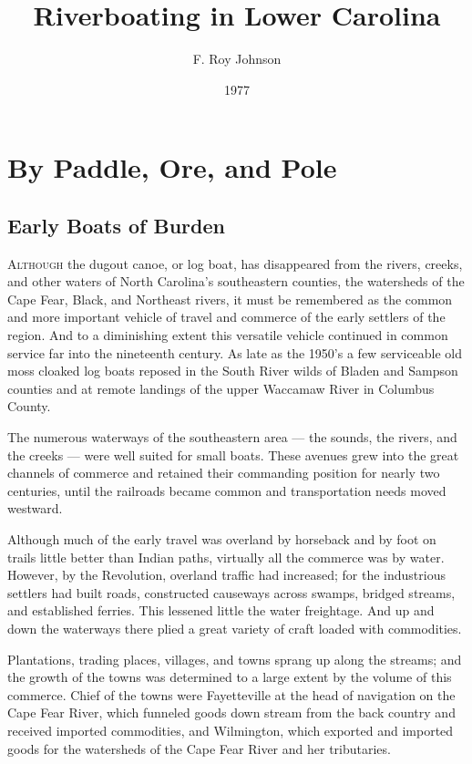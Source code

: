 \documentclass[11pt, a5paper]{book}
\begin{document}
\renewcommand{\thechapter}{\Roman{chapter}}
\title{Riverboating in Lower Carolina}
\author{F. Roy Johnson}
\date{1977}

\maketitle


\chapter{By Paddle, Ore, and Pole}

\section*{Early Boats of Burden}

\textsc{Although} the dugout canoe, or log boat, has disappeared from
the rivers, creeks, and other waters of North Carolina's southeastern
counties, the watersheds of the Cape Fear, Black, and Northeast
rivers, it must be remembered as the common and more important vehicle
of travel and commerce of the early settlers of the region.  And to a
diminishing extent this versatile vehicle continued in common service
far into the nineteenth century.  As late as the 1950's a few
serviceable old moss cloaked log boats reposed in the South River
wilds of Bladen and Sampson counties and at remote landings of the
upper Waccamaw River in Columbus County.\par

The numerous waterways of the southeastern area --- the sounds, the
rivers, and the creeks --- were well suited for small boats.  These
avenues grew into the great channels of commerce and retained their
commanding position for nearly two centuries, until the railroads
became common and transportation needs moved westward.\par

Although much of the early travel was overland by horseback and by
foot on trails little better than Indian paths, virtually all the
commerce was by water.  However, by the Revolution, overland traffic
had increased; for the industrious settlers had built roads,
constructed causeways across swamps, bridged streams, and established
ferries.  This lessened little the water freightage.  And up and down
the waterways there plied a great variety of craft loaded with
commodities.\par

Plantations, trading places, villages, and towns sprang up along the
streams; and the growth of the towns was determined to a large extent
by the volume of this commerce.  Chief of the towns were Fayetteville
at the head of navigation on the Cape Fear River, which funneled goods
down stream from the back country and received imported commodities,
and Wilmington, which exported and imported goods for the watersheds
of the Cape Fear River and her tributaries.\par
\end{document}
